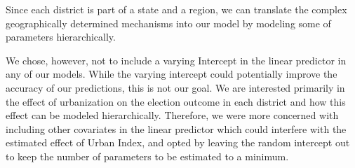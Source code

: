 \documentclass[12pt]{article}
\begin{document}
Since each district is part of a state and a region, we can translate the complex geographically determined mechanisms into our model by modeling some of parameters hierarchically.



We chose, however, not to include a varying Intercept in the linear predictor in any of our models. While the varying intercept could potentially improve the accuracy of our predictions, this is not our goal. We are interested primarily in the effect of urbanization on the election outcome in each district and how this effect can be modeled hierarchically. Therefore, we were more concerned with including other covariates in the linear predictor which could interfere with the estimated effect of Urban Index, and opted by leaving the random intercept out to keep the number of parameters to be estimated to a minimum.

\end{document}
